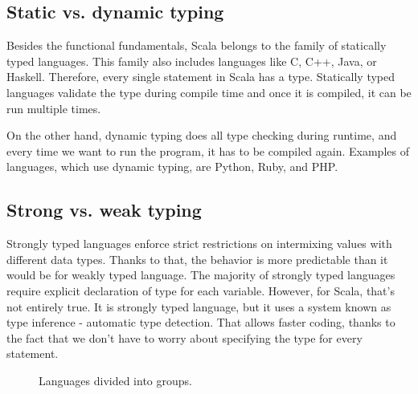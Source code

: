 \subsection{Static vs. dynamic typing}
Besides the functional fundamentals, Scala belongs to the family of statically typed languages. This family also includes languages like C, C++, Java, or Haskell. Therefore, every single statement in Scala has a type.\cite{Static vs dynamic} Statically typed languages validate the type during compile time and once it is compiled, it can be run multiple times.

On the other hand, dynamic typing does all type checking during runtime, and every time we want to run the program, it has to be compiled again. Examples of languages, which use dynamic typing, are Python, Ruby, and PHP.

\subsection{Strong vs. weak typing}
Strongly typed languages enforce strict restrictions on intermixing values with different data types. Thanks to that, the behavior is more predictable than it would be for weakly typed language. The majority of strongly typed languages require explicit declaration of type for each variable. However, for Scala, that's not entirely true. It is strongly typed language, but it uses a system known as type inference - automatic type detection. That allows faster coding, thanks to the fact that we don’t have to worry about specifying the type for every statement. 

\begin{figure}[h]
  \caption {Languages divided into groups.}
\end{figure}

